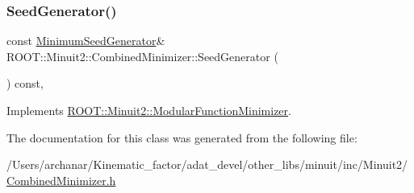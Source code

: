 \mbox{\label{classROOT_1_1Minuit2_1_1CombinedMinimizer_a667ce6c321b6948d37087a2ac06be58c}} 
\subsubsection{\texorpdfstring{SeedGenerator()}{SeedGenerator()}\hspace{0.1cm}{\footnotesize\ttfamily [2/2]}}
{\footnotesize\ttfamily const \mbox{\hyperlink{classROOT_1_1Minuit2_1_1MinimumSeedGenerator}{Minimum\+Seed\+Generator}}\& R\+O\+O\+T\+::\+Minuit2\+::\+Combined\+Minimizer\+::\+Seed\+Generator (\begin{DoxyParamCaption}{ }\end{DoxyParamCaption}) const\hspace{0.3cm}{\ttfamily [inline]}, {\ttfamily [virtual]}}



Implements \mbox{\hyperlink{classROOT_1_1Minuit2_1_1ModularFunctionMinimizer_a742930de97b0ce9ba23773874ae0894b}{R\+O\+O\+T\+::\+Minuit2\+::\+Modular\+Function\+Minimizer}}.



The documentation for this class was generated from the following file\+:\begin{DoxyCompactItemize}
\item 
/\+Users/archanar/\+Kinematic\+\_\+factor/adat\+\_\+devel/other\+\_\+libs/minuit/inc/\+Minuit2/\mbox{\hyperlink{other__libs_2minuit_2inc_2Minuit2_2CombinedMinimizer_8h}{Combined\+Minimizer.\+h}}\end{DoxyCompactItemize}
